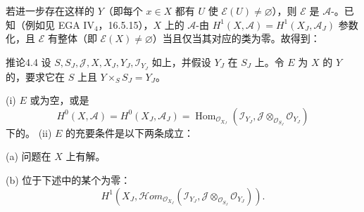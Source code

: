 若进一步存在这样的 $Y$（即每个 $x\in X$ 都有 $U$ 使 $\mathscr E(U)\ne\varnothing$），则 $\mathscr E$ 是 $\mathscr A$-。已知（例如见 EGA IV$_4$，16.5.15），$X$ 上的 $\mathscr A$-由 $H^1(X,\mathscr A)=H^1(X_J,\mathscr A_J)$ 参数化，且 $\mathscr E$ 有整体（即 $\mathscr E(X)\ne\varnothing$）当且仅当其对应的类为零。故得到：
\begin{SGAresult}{推论}{4.4}
设 $S,S_J,\mathscr J,X,X_J,Y_J,\mathscr I_{Y_J}$ 如上，并假设 $Y_J$ 在 $S_J$ 上。令 $E$ 为 $X$ 的 $Y$ 的，要求它在 $S$ 上且 $Y\times_S S_J=Y_J$。

(i) $E$ 或为空，或是
\[H^0(X,\mathscr A)=H^0(X_J,\mathscr A_J)=\operatorname{Hom}_{\mathscr O_{X_J}}(\mathscr I_{Y_J},\mathscr J\otimes_{\mathscr O_{S_J}}\mathscr O_{Y_J})\]
下的。
(ii) $E$ 的充要条件是以下两条成立：

(a) 问题在 $X$ 上有解。

(b) 位于下述中的某个为零：
\[H^1(X_J,\mathscr Hom_{\mathscr O_{X_J}}(\mathscr I_{Y_J},\mathscr J\otimes_{\mathscr O_{S_J}}\mathscr O_{Y_J})).\]
\end{SGAresult}
